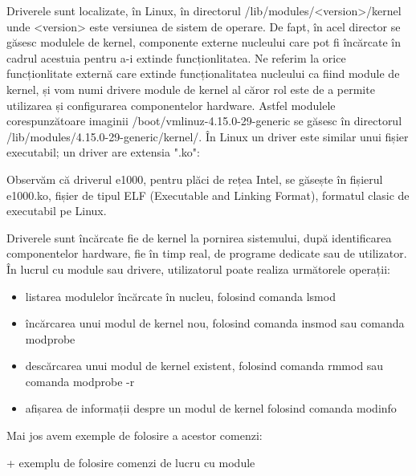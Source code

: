Driverele sunt localizate, în Linux, în directorul /lib/modules/<version>/kernel
unde <version> este versiunea de sistem de operare. De fapt, în acel director se
găsesc modulele de kernel, componente externe nucleului care pot fi încărcate în
cadrul acestuia pentru a-i extinde funcționlitatea. Ne referim la orice
funcționlitate externă care extinde funcționalitatea nucleului ca fiind module
de kernel, și vom numi drivere module de kernel al căror rol este de a permite
utilizarea și configurarea componentelor hardware. Astfel modulele
corespunzătoare imaginii /boot/vmlinuz-4.15.0-29-generic se găsesc în directorul
/lib/modules/4.15.0-29-generic/kernel/. În Linux un driver este similar unui
fișier executabil; un driver are extensia ".ko":


Observăm că driverul e1000, pentru plăci de rețea Intel, se găsește în fișierul
e1000.ko, fișier de tipul ELF  (Executable
and Linking Format), formatul clasic de executabil pe Linux.

Driverele sunt încărcate fie de kernel la pornirea sistemului, după
identificarea componentelor hardware, fie în timp real, de programe dedicate sau
de utilizator. În lucrul cu module sau drivere, utilizatorul poate realiza
următorele operații:

\begin{itemize}
	\item listarea modulelor încărcate în nucleu, folosind comanda lsmod
	\item încărcarea unui modul de kernel nou, folosind comanda insmod sau
		comanda modprobe
	\item descărcarea unui modul de kernel existent, folosind comanda rmmod
		sau comanda modprobe -r
	\item afișarea de informații despre un modul de kernel folosind comanda
		modinfo
\end{itemize}

Mai jos avem exemple de folosire a acestor comenzi:

+ exemplu de folosire comenzi de lucru cu module

